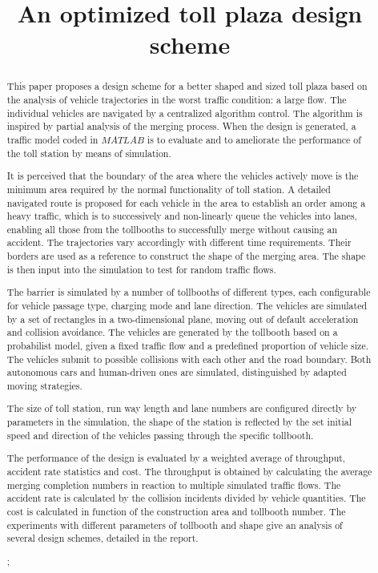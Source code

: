 \documentclass{mcmthesis}
\title{An optimized toll plaza design scheme}
\begin{document}
	
	
\begin{abstract}
	
This paper proposes a design scheme for a better shaped and sized toll plaza based on the analysis of vehicle trajectories in the worst traffic condition: a large flow. The individual vehicles are navigated by a centralized algorithm control. The algorithm is inspired by partial analysis of the merging process. When the design is generated, a traffic model coded in $MATLAB$ is to evaluate and to ameliorate the performance of the toll station by means of simulation.

It is perceived that the boundary of the area where the vehicles actively move is the minimum area required by the normal functionality of toll station. A detailed navigated route is proposed for each vehicle in the area to establish an order among a heavy traffic, which is to successively and non-linearly queue the vehicles into lanes, enabling all those from the tollbooths to successfully merge without causing an accident. The trajectories vary accordingly with different time requirements. Their borders are used as a reference to construct the shape of the merging area. The shape is then input into the simulation to test for random traffic flows. 

The barrier is simulated by a number of tollbooths of different types, each configurable for vehicle passage type, charging mode and lane direction. The vehicles are simulated by a set of rectangles in a two-dimensional plane, moving out of default acceleration and collision avoidance. The vehicles are generated by the tollbooth based on a probabilist model, given a fixed traffic flow and a predefined proportion of vehicle size. The vehicles submit to possible collisions with each other  and the road boundary. Both autonomous cars and human-driven ones are simulated, distinguished by adapted moving strategies.

The size of toll station, run way length and lane numbers are configured directly by parameters in the simulation, the shape of the station is reflected by the set initial speed and direction of the vehicles passing through the specific tollbooth. 

The performance of the design is evaluated by a weighted average of throughput, accident rate statistics and cost. The throughput is obtained by calculating the average merging completion numbers in reaction to multiple simulated traffic flows. The accident rate is calculated by the collision incidents divided by vehicle quantities. The cost is calculated in function of the construction area and tollbooth number. The experiments with different parameters of tollbooth and shape give an analysis of several design schemes, detailed in the report.


\begin{keywords}
;
\end{keywords}
\end{abstract}
\end{document}
